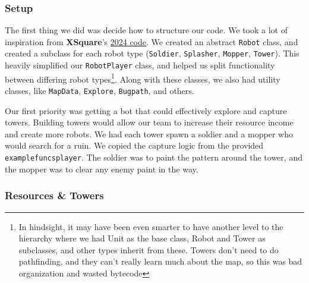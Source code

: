 \subsubsection{Setup}

The first thing we did was decide how to structure our code. We took a lot of inspiration from \textbf{XSquare}'s \href{https://github.com/IvanGeffner/BTC24}{2024 code}. We created an abstract \verb|Robot| class, and created a subclass for each robot type (\verb|Soldier|, \verb|Splasher|, \verb|Mopper|, \verb|Tower|). This heavily simplified our \verb|RobotPlayer| class, and helped us split functionality between differing robot types\footnote{In hindsight, it may have been even smarter to have another level to the hierarchy where we had Unit as the base class, Robot and Tower as subclasses, and other types inherit from these. Towers don't need to do pathfinding, and they can't really learn much about the map, so this was bad organization and wasted bytecode}. Along with these classes, we also had utility classes, like \verb|MapData|, \verb|Explore|, \verb|Bugpath|, and others.

\medskip

Our first priority was getting a bot that could effectively explore and capture towers. Building towers would allow our team to increase their resource income and create more robots. We had each tower spawn a soldier and a mopper who would search for a ruin. We copied the capture logic from the provided \verb|examplefuncsplayer|. The soldier was to paint the pattern around the tower, and the mopper was to clear any enemy paint in the way.

\subsubsection{Resources \& Towers}

